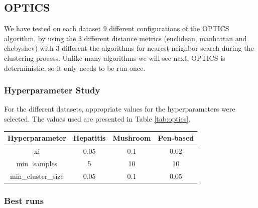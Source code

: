 \subsection{OPTICS}
We have tested on each dataset 9 different configurations of the OPTICS algorithm, by using the 3 different
distance metrics (euclidean, manhattan and chebyshev) with 3 different the algorithms for nearest-neighbor search
 during the clustering process. Unlike many algorithms we will see next, OPTICS is deterministic, so it only needs to be run once.
\subsubsection{Hyperparameter Study}
For the different datasets, appropriate values for the hyperparameters were selected. The values used are presented in Table \ref{tab:optics}.
\begin{table}[h!]
    \centering
    \begin{tabular}{|c|c|c|c|}
    \hline
    Hyperparameter     & Hepatitis & Mushroom & Pen-based \\ \hline
    xi                 &  0.05         &   0.1       &  0.02         \\ \hline
    min\_samples       &     5      &     10     &     10   \\ \hline
    min\_cluster\_size &     0.05      &     0.1     &    0.05       \\ \hline
    \end{tabular}
    \end{table}
\subsubsection{Best runs}


